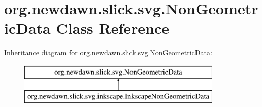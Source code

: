 \hypertarget{classorg_1_1newdawn_1_1slick_1_1svg_1_1_non_geometric_data}{}\section{org.\+newdawn.\+slick.\+svg.\+Non\+Geometric\+Data Class Reference}
\label{classorg_1_1newdawn_1_1slick_1_1svg_1_1_non_geometric_data}
Inheritance diagram for org.\+newdawn.\+slick.\+svg.\+Non\+Geometric\+Data\+:\begin{figure}[H]
\begin{center}
\leavevmode
\includegraphics[height=2.000000cm]{classorg_1_1newdawn_1_1slick_1_1svg_1_1_non_geometric_data}
\end{center}
\end{figure}
